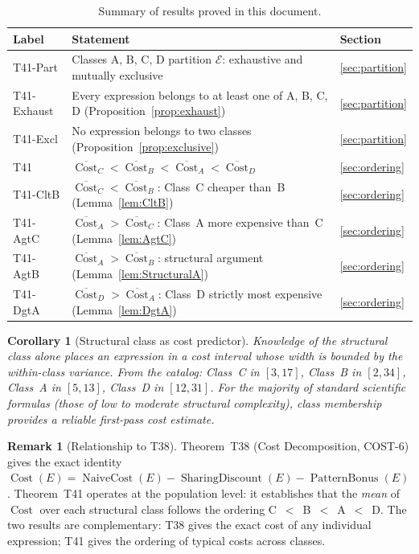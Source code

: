 \documentclass[12pt,a4paper]{article}
\newtheorem{corollary}[theorem]{Corollary}
\theoremstyle{definition}
\newtheorem{remark}[theorem]{Remark}
\newcommand{\Cost}{\operatorname{Cost}}
\newcommand{\NC}{\operatorname{NaiveCost}}
\newcommand{\SD}{\operatorname{SharingDiscount}}
\newcommand{\PB}{\operatorname{PatternBonus}}
\begin{document}
\begin{table}[h]
\centering
\caption{Summary of results proved in this document.}
\label{tab:results}
\smallskip
\begin{tabular}{@{}lL{8cm}l@{}}
\toprule
\textbf{Label} & \textbf{Statement} & \textbf{Section} \\
\midrule
T41-Part
  & Classes A, B, C, D partition $\mathcal{E}$: exhaustive and
    mutually exclusive
  & \ref{sec:partition} \\[4pt]
T41-Exhaust
  & Every expression belongs to at least one of A, B, C, D
    (Proposition~\ref{prop:exhaust})
  & \ref{sec:partition} \\[4pt]
T41-Excl
  & No expression belongs to two classes
    (Proposition~\ref{prop:exclusive})
  & \ref{sec:partition} \\[4pt]
T41
  & $\overline{\Cost}_C < \overline{\Cost}_B <
    \overline{\Cost}_A < \overline{\Cost}_D$
  & \ref{sec:ordering} \\[4pt]
T41-CltB
  & $\overline{\Cost}_C < \overline{\Cost}_B$: Class~C cheaper than~B
    (Lemma~\ref{lem:CltB})
  & \ref{sec:ordering} \\[4pt]
T41-AgtC
  & $\overline{\Cost}_A > \overline{\Cost}_C$: Class~A more expensive
    than~C (Lemma~\ref{lem:AgtC})
  & \ref{sec:ordering} \\[4pt]
T41-AgtB
  & $\overline{\Cost}_A > \overline{\Cost}_B$: structural argument
    (Lemma~\ref{lem:StructuralA})
  & \ref{sec:ordering} \\[4pt]
T41-DgtA
  & $\overline{\Cost}_D > \overline{\Cost}_A$: Class~D strictly most
    expensive (Lemma~\ref{lem:DgtA})
  & \ref{sec:ordering} \\
\bottomrule
\end{tabular}
\end{table}

\begin{corollary}[Structural class as cost predictor]
\label{cor:predictor}
Knowledge of the structural class alone places an expression in a
cost interval whose width is bounded by the within-class variance.
From the catalog: Class~C in $[3,17]$, Class~B in $[2,34]$, Class~A
in $[5,13]$, Class~D in $[12,31]$.
For the majority of standard scientific formulas (those of low to
moderate structural complexity), class membership provides a reliable
first-pass cost estimate.
\end{corollary}

\begin{remark}[Relationship to T38]
\label{rem:T38}
Theorem~T38 (Cost Decomposition, COST-6) gives the exact identity
$\Cost(E) = \NC(E) - \SD(E) - \PB(E)$.
Theorem~T41 operates at the population level: it establishes that the
\emph{mean} of $\Cost$ over each structural class follows the ordering
C~$<$~B~$<$~A~$<$~D.
The two results are complementary: T38 gives the exact cost of any
individual expression; T41 gives the ordering of typical costs across
classes.
\end{remark}
\end{document}
